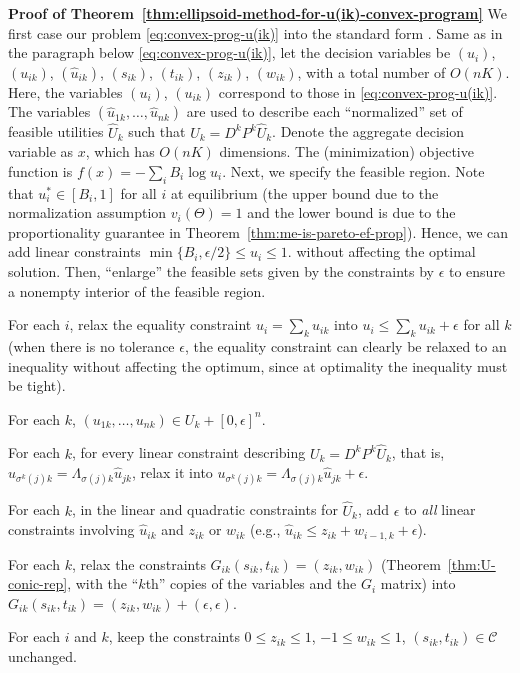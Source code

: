 \smallskip\noindent\textbf{Proof of Theorem~\ref{thm:ellipsoid-method-for-u(ik)-convex-program}}
We first case our problem \eqref{eq:convex-prog-u(ik)} into the standard form \cite[4.1.10]{ben2019lectures}. Same as in the paragraph below \eqref{eq:convex-prog-u(ik)}, 
let the decision variables be $(u_i)$, $(u_{ik})$, $(\hat{u}_{ik})$, $(s_{ik})$, $(t_{ik})$, $(z_{ik})$, $(w_{ik})$, with a total number of $O(nK)$. 
Here, the variables $(u_i)$, $(u_{ik})$ correspond to those in \eqref{eq:convex-prog-u(ik)}. 
The variables $(\hat{u}_{1k}, \dots, \hat{u}_{nk})$ are used to describe each ``normalized'' set of feasible utilities $\hat{U}_k$ such that $U_k = D^k P^k \hat{U}_k$.
Denote the aggregate decision variable as $x$, which has $O(nK)$ dimensions. The (minimization) objective function is 
$f(x) = - \sum_i B_i \log u_i$. 
Next, we specify the feasible region. Note that $u^*_i \in [B_i, 1]$ for all $i$ at equilibrium (the upper bound due to the normalization assumption $v_i(\Theta)=1$ and the lower bound is due to the proportionality guarantee in Theorem~\ref{thm:me-is-pareto-ef-prop}). 
Hence, we can add linear constraints $\min\{B_i, \epsilon/2\} \leq u_i \leq 1$.
without affecting the optimal solution. 
Then, ``enlarge'' the feasible sets given by the constraints by $\epsilon$ to ensure a nonempty interior of the feasible region.
\begin{enumerate*}[(i)]
	\item For each $i$, relax the equality constraint $u_i = \sum_k u_{ik}$ into $u_i \leq \sum_k u_{ik} + \epsilon$ for all $k$ (when there is no tolerance $\epsilon$, the equality constraint can clearly be relaxed to an inequality without affecting the optimum, since at optimality the inequality must be tight).
	\item For each $k$, $(u_{1k}, \dots, u_{nk})\in U_k + [0,\epsilon]^n$.
	\item For each $k$, for every linear constraint describing $U_k = D^k P^k \hat{U}_k$, that is, $u_{\sigma^k(j)k} = \Lambda_{\sigma(j) k} \hat{u}_{jk}$, relax it into $u_{\sigma^k(j)k} = \Lambda_{\sigma(j) k} \hat{u}_{jk} + \epsilon$.
	\item For each $k$, in the linear and quadratic constraints for $\hat{U}_k$, add $\epsilon$ to \emph{all} linear constraints involving $\hat{u}_{ik}$ and $z_{ik}$ or $w_{ik}$ (e.g., $\hat{u}_{ik} \leq z_{ik} + w_{i-1,k} + \epsilon$).
	\item For each $k$, relax the constraints $G_{ik} (s_{ik}, t_{ik}) = (z_{ik}, w_{ik})$ (Theorem~\ref{thm:U-conic-rep}, with the ``$k$th'' copies of the variables and the $G_i$ matrix) into $G_{ik} (s_{ik}, t_{ik}) = (z_{ik}, w_{ik}) + (\epsilon, \epsilon)$.
	\item For each $i$ and $k$, keep the constraints $0\leq z_{ik}\leq 1$, $-1\leq w_{ik}\leq 1$, $(s_{ik}, t_{ik})\in\mathcal{C}$ unchanged.
\end{enumerate*}
